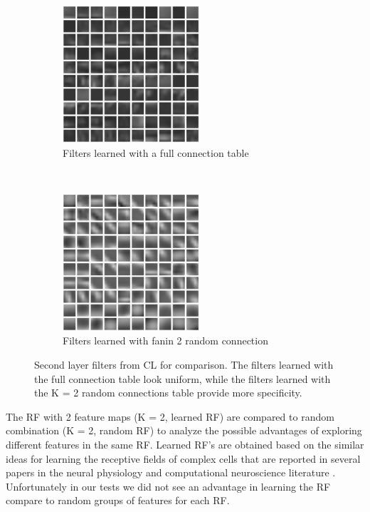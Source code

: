 \documentclass{article} %
\begin{document}
\begin{figure}
        \centering
        \label{fig-secondkernels}
        \begin{subfigure}[b]{0.5\textwidth}
                \centering
                \includegraphics[width=2.0in]{fig-kernels2-full.eps}
                \caption{Filters learned with a full connection table}
                \label{fig-secondkernels-full}
        \end{subfigure}%
        ~%
        \begin{subfigure}[b]{0.5\textwidth}
                \centering
                \includegraphics[width=2.0in]{fig-kernels2-random.eps}
                \caption{Filters learned with fanin 2 random connection}
                \label{fig-secondkernels-random}
        \end{subfigure}
        \caption{Second layer filters from CL for comparison.  The filters learned with the full connection table look uniform, while the filters learned with the K = 2 random connections table provide more specificity.}
\end{figure}


The RF with 2 feature maps (K = 2, learned RF) are compared to random combination (K = 2, random RF) to analyze the possible advantages of exploring different features in the same RF. Learned RF's are obtained  based on the similar ideas for learning the receptive fields of complex cells that are reported in  several papers in the neural physiology and computational neuroscience literature \cite{masquelier2007learning,spratling2005learning,wiskott2002slow,wallis1997invariant}.
Unfortunately in our tests we did not see an advantage in learning the RF compare to random groups of features for each RF.
\end{document}
